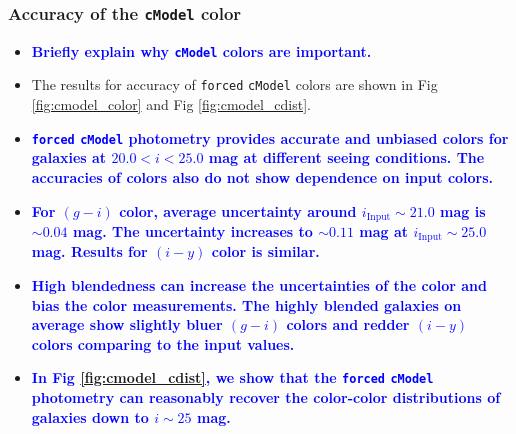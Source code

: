 \documentclass[useamsfonts]{pasj01}
\def\cmodel{\texttt{cModel}}
\def\forced{\texttt{forced}}
\newcommand{\plan}[1]{\textcolor{blue} {\textbf{#1}}}
\begin{document}
\subsubsection{Accuracy of the \cmodel{} color}

    \begin{itemize}
    
        \item \plan{Briefly explain why \cmodel{} colors are important.}
            
        \item The results for accuracy of \forced{} \cmodel{} colors are shown in 
            Fig \ref{fig:cmodel_color} and Fig \ref{fig:cmodel_cdist}.
        
        \item \plan{\forced{} \cmodel{} photometry provides accurate and unbiased 
            colors for galaxies at $20.0 < i < 25.0$ mag at different seeing conditions.
            The accuracies of colors also do not show dependence on input colors. 
            } 
       
        \item \plan{For $(g-i)$ color, average uncertainty around 
            $i_{\mathrm{Input}}{\sim}21.0$ mag is ${\sim}0.04$ mag. 
            The uncertainty increases to ${\sim}0.11$ mag at
            $i_{\mathrm{Input}}{\sim}25.0$ mag. 
            Results for $(i-y)$ color is similar.}
        
        \item \plan{High blendedness can increase the uncertainties of the color 
            and bias the color measurements. 
            The highly blended galaxies on average show slightly bluer $(g-i)$ colors 
            and redder $(i-y)$ colors comparing to the input values.}
            
        \item \plan{In Fig \ref{fig:cmodel_cdist}, we show that the \forced{} \cmodel{} 
            photometry can reasonably recover the color-color distributions of galaxies 
            down to $i{\sim}25$ mag.
            }
                 
    \end{itemize}    
    
\end{document}
